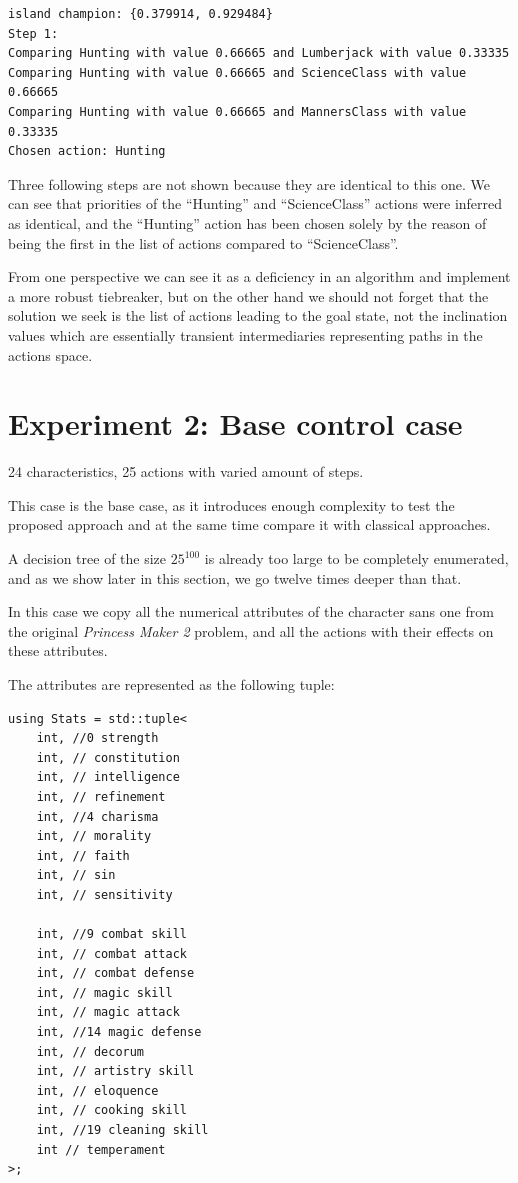 \documentclass[12pt, a4paper]{report}
\begin{document}
	\begin{verbatim}
island champion: {0.379914, 0.929484}
Step 1:
Comparing Hunting with value 0.66665 and Lumberjack with value 0.33335
Comparing Hunting with value 0.66665 and ScienceClass with value 0.66665
Comparing Hunting with value 0.66665 and MannersClass with value 0.33335
Chosen action: Hunting
	\end{verbatim}
	
	Three following steps are not shown because they are identical to this one.
	We can see that priorities of the ``Hunting'' and ``ScienceClass'' actions were inferred as identical,
	and the ``Hunting'' action has been chosen solely by the reason of being the first in the list of actions compared to ``ScienceClass''.
	
	From one perspective we can see it as a deficiency in an algorithm and implement a more robust tiebreaker, but on the other hand we should not forget that the solution we seek is the list of actions leading to the goal state,
	not the inclination values which are essentially transient intermediaries representing paths in the actions space.
	
	\chapter{Experiment 2: Base control case}\label{section::control-case}
    
	24 characteristics, 25 actions with varied amount of steps.

	This case is the base case, as it introduces enough complexity to test the proposed approach and at the same time compare it with classical approaches.

	A decision tree of the size $25^{100}$ is already too large to be completely enumerated, and as we show later in this section, we go twelve times deeper than that.

	In this case we copy all the numerical attributes of the character sans one from the original \textit{Princess Maker 2} problem, and all the actions with their effects on these attributes.
	
	The attributes are represented as the following tuple:
	
	\begin{lstlisting}
using Stats = std::tuple<
	int, //0 strength
	int, // constitution
	int, // intelligence
	int, // refinement
	int, //4 charisma
	int, // morality
	int, // faith
	int, // sin
	int, // sensitivity
	
	int, //9 combat skill
	int, // combat attack
	int, // combat defense
	int, // magic skill
	int, // magic attack
	int, //14 magic defense
	int, // decorum
	int, // artistry skill
	int, // eloquence
	int, // cooking skill
	int, //19 cleaning skill
	int // temperament
>;
	\end{lstlisting}
	
\end{document}
